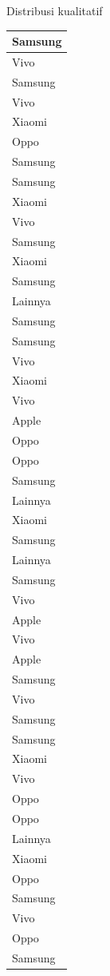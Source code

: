 \documentclass[
  ignorenonframetext,
]{beamer}
\begin{document}
\begin{frame}[s]{Distribusi kualitatif}
\begin{table}
\begin{tabular}[t]{l}
\hline
Samsung\\
\hline
Vivo\\
\hline
Samsung\\
\hline
Vivo\\
\hline
Xiaomi\\
\hline
Oppo\\
\hline
Samsung\\
\hline
Samsung\\
\hline
Xiaomi\\
\hline
Vivo\\
\hline
Samsung\\
\hline
Xiaomi\\
\hline
Samsung\\
\hline
Lainnya\\
\hline
Samsung\\
\hline
Samsung\\
\hline
Vivo\\
\hline
Xiaomi\\
\hline
Vivo\\
\hline
Apple\\
\hline
Oppo\\
\hline
Oppo\\
\hline
Samsung\\
\hline
Lainnya\\
\hline
Xiaomi\\
\hline
Samsung\\
\hline
Lainnya\\
\hline
Samsung\\
\hline
Vivo\\
\hline
Apple\\
\hline
Vivo\\
\hline
Apple\\
\hline
Samsung\\
\hline
Vivo\\
\hline
Samsung\\
\hline
Samsung\\
\hline
Xiaomi\\
\hline
Vivo\\
\hline
Oppo\\
\hline
Oppo\\
\hline
Lainnya\\
\hline
Xiaomi\\
\hline
Oppo\\
\hline
Samsung\\
\hline
Vivo\\
\hline
Oppo\\
\hline
Samsung\\

\end{tabular}
\end{table}
\end{frame}
\end{document}
